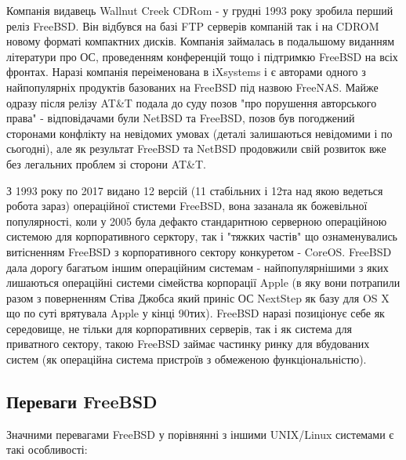 Компанія видавець Wallnut Creek CDRom - у грудні 1993 року зробила перший реліз FreeBSD. Він відбувся на базі FTP серверів компаній так і на CDROM новому форматі компактних дисків. Компанія займалась в подальшому виданням літератури про ОС, проведенням конференцій тощо і підтримкю FreeBSD на всіх фронтах. Наразі компанія переіменована в iXsystems і є авторами одного з найпопулярніх продуктів базованих на FreeBSD під назвою FreeNAS. Майже одразу після релізу AT\&T подала до суду позов "про порушення авторського права" - відповідачами були NetBSD та FreeBSD, позов був погоджений сторонами конфлікту на невідомих умовах (деталі залишаються невідомими і по сьогодні), але як результат FreeBSD та NetBSD продовжили свій розвиток вже без легальних проблем зі сторони AT\&T.

З 1993 року по 2017 видано 12 версій (11 стабільних і 12та над якою ведеться робота зараз) операційної стистеми FreeBSD, вона зазанала як божевільної популярності, коли у 2005 була дефакто стандарнтною серверною операційною системою для корпоративного серктору, так і "тяжких частів" що ознаменувались витісненням FreeBSD з корпоративного сектору конкуретом - CoreOS. FreeBSD дала дорогу багатьом іншим операційним системам - найпопулярнішими з яких лишаються операційні системи сімейства корпорації Apple (в яку вони потрапили разом з поверненням Стіва Джобса який приніс ОС NextStep як базу для OS X що по суті врятувала Apple у кінці 90тих). FreeBSD наразі позиціонує себе як середовище, не тільки для корпоративних серверів, так і як система для приватного сектору, такою FreeBSD займає частинку ринку для вбудованих систем (як операційна система пристроїв з обмеженою функціональністю).

\subsection{Переваги FreeBSD}
Значними перевагами FreeBSD у порівнянні з іншими UNIX/Linux системами є такі особливості:

